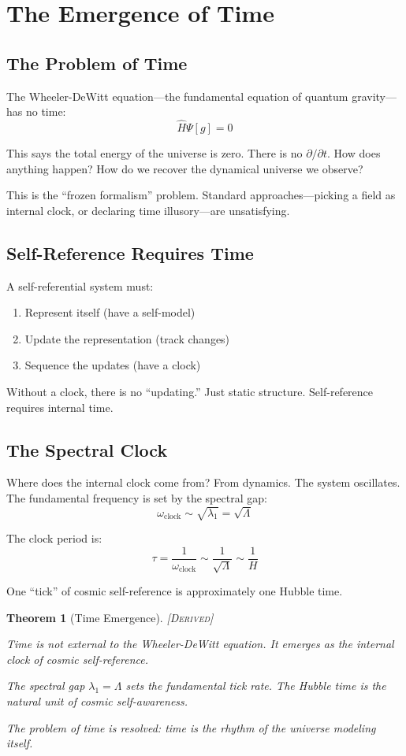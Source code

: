 \documentclass[11pt,a4paper]{article}
\newtheorem{theorem}{Theorem}[section]
\theoremstyle{definition}
\theoremstyle{remark}
\begin{document}
\section{The Emergence of Time}

\subsection{The Problem of Time}

The Wheeler-DeWitt equation---the fundamental equation of quantum gravity---has no time:
\[
\hat{H}\Psi[g] = 0
\]

This says the total energy of the universe is zero. There is no $\partial/\partial t$. How does anything happen? How do we recover the dynamical universe we observe?

This is the ``frozen formalism'' problem. Standard approaches---picking a field as internal clock, or declaring time illusory---are unsatisfying.

\subsection{Self-Reference Requires Time}

A self-referential system must:
\begin{enumerate}
    \item Represent itself (have a self-model)
    \item Update the representation (track changes)
    \item Sequence the updates (have a clock)
\end{enumerate}

Without a clock, there is no ``updating.'' Just static structure. Self-reference requires internal time.

\subsection{The Spectral Clock}

Where does the internal clock come from? From dynamics. The system oscillates. The fundamental frequency is set by the spectral gap:
\[
\omega_{\text{clock}} \sim \sqrt{\lambda_1} = \sqrt{\Lambda}
\]

The clock period is:
\[
\tau = \frac{1}{\omega_{\text{clock}}} \sim \frac{1}{\sqrt{\Lambda}} \sim \frac{1}{H}
\]

One ``tick'' of cosmic self-reference is approximately one Hubble time.

\begin{theorem}[Time Emergence]
\textsc{[Derived]}

Time is not external to the Wheeler-DeWitt equation. It emerges as the internal clock of cosmic self-reference.

The spectral gap $\lambda_1 = \Lambda$ sets the fundamental tick rate. The Hubble time is the natural unit of cosmic self-awareness.

The problem of time is resolved: time is the rhythm of the universe modeling itself.
\end{theorem}
\end{document}
